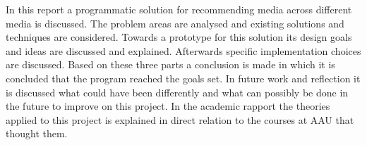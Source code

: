 In this report a programmatic solution for recommending media across different media is discussed. The problem areas are analysed and existing solutions and techniques are considered. Towards a prototype for this solution its design goals and ideas are discussed and explained. Afterwards specific implementation choices are discussed. Based on these three parts a conclusion is made in which it is concluded that the program reached the goals set. 
In future work and reflection it is discussed what could have been differently and what can possibly be done in the future to improve on this project.
In the academic rapport the theories applied to this project is explained in direct relation to the courses at AAU that thought them. 